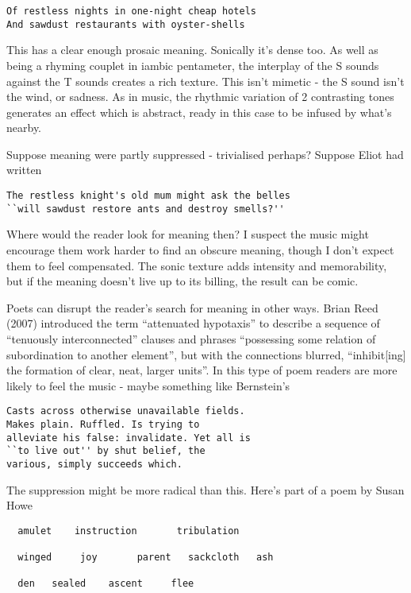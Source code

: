 \documentclass[11pt]{article}
\begin{document}
\begin{verbatim}
Of restless nights in one-night cheap hotels 
And sawdust restaurants with oyster-shells 
\end{verbatim}

This has a clear enough prosaic meaning. Sonically
it's dense too. As well as being a rhyming couplet in iambic pentameter, the interplay of the
S sounds against the T sounds creates a rich texture. This isn't mimetic -
the S sound isn't the wind, or sadness. As in music, the rhythmic variation of 2
contrasting tones generates an effect which is abstract, ready in this case to be infused by what's nearby.

Suppose meaning were partly suppressed - trivialised perhaps? Suppose Eliot had written

\begin{verbatim}
The restless knight's old mum might ask the belles
``will sawdust restore ants and destroy smells?'' 
\end{verbatim}

Where would the reader look for meaning then? I suspect the music might encourage them work harder to find an obscure meaning, though I don't expect them to feel compensated. The sonic texture adds intensity and memorability, but if the meaning doesn't live up to its billing, the result can be comic.

Poets can disrupt the reader's search for meaning in other ways. Brian Reed (2007) introduced the term ``attenuated hypotaxis'' to describe a sequence of ``tenuously interconnected'' clauses and phrases ``possessing some relation of subordination to another element'', but with the connections blurred, ``inhibit[ing] the formation of clear, neat, larger units''. In this type of poem readers are more likely to feel the music  - maybe something like Bernstein's
\begin{verbatim}        
Casts across otherwise unavailable fields.
Makes plain. Ruffled. Is trying to
alleviate his false: invalidate. Yet all is
``to live out'' by shut belief, the
various, simply succeeds which.
\end{verbatim}


The suppression might be more radical than this. Here's part of a poem by Susan Howe
\begin{verbatim}
  amulet    instruction       tribulation 

  winged     joy       parent   sackcloth   ash 

  den   sealed    ascent     flee 
\end{verbatim}
\end{document}

